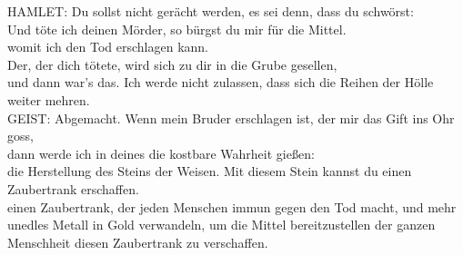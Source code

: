 {\begin{playdialog}
HAMLET: Du sollst nicht gerächt werden, es sei denn, dass du schwörst:\\
Und töte ich deinen Mörder, so bürgst du mir für die Mittel.\\
womit ich den Tod erschlagen kann.\\
Der, der dich tötete, wird sich zu dir in die Grube gesellen,\\
und dann war's das. Ich werde nicht zulassen, dass sich die Reihen der Hölle weiter mehren.\\


GEIST: Abgemacht. Wenn mein Bruder erschlagen ist, der mir das Gift ins Ohr goss,\\
dann werde ich in deines die kostbare Wahrheit gießen:\\
die Herstellung des Steins der Weisen. Mit diesem Stein kannst du einen Zaubertrank erschaffen.\\
einen Zaubertrank, der jeden Menschen immun gegen den Tod macht, und mehr\\
unedles Metall in Gold verwandeln, um die Mittel bereitzustellen der ganzen Menschheit diesen Zaubertrank zu verschaffen.\\


\end{playdialog}}

